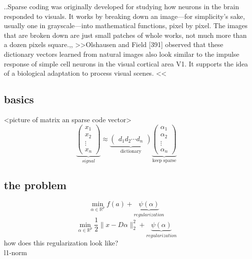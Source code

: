 \begin{frame}
..Sparse coding was originally developed for studying how neurons in the brain responded to visuals. It works by breaking down an image—for simplicity's sake, usually one in grayscale—into mathematical functions, pixel by pixel. The images that are broken down are just small patches of whole works, not much more than a dozen pixels square.,,
>>Olshausen and Field [391] observed that these
dictionary vectors learned from natural images also look similar to the impulse
response of simple cell neurons in the visual cortical area V1. It supports the idea
of a biological adaptation to process visual scenes. <<
\end{frame}

\subsection{basics}
\begin{frame}
<picture of matrix an sparse code vector>
\[
\underbrace{\begin{pmatrix} x_1 \\ x_2 \\ \vdots \\ x_n \end{pmatrix}}_{signal} \approx \underbrace{\begin{pmatrix} d_1  d_2 \cdots d_n \end{pmatrix}}_{\textrm{dictionary}}
\underbrace{\begin{pmatrix} \alpha_1 \\ \alpha_2 \\ \vdots \\ \alpha_n \end{pmatrix}}_{\textrm{keep sparse}}
\]
\end{frame}

\subsection{the problem}
\begin{frame}
\[ 
\min_{\alpha\in\mathbb{R}^{p}} f(a) + \underbrace{\psi(\alpha)}_{regularization} 
\]
\[
\min_{\alpha\in\mathbb{R}^{p}} \frac{1}{2} \lVert x - D\alpha \rVert^{2}_{2} + \underbrace{\psi(\alpha)}_{regularization}
\] 
how does this regularization look like? \\
l1-norm

\end{frame}


